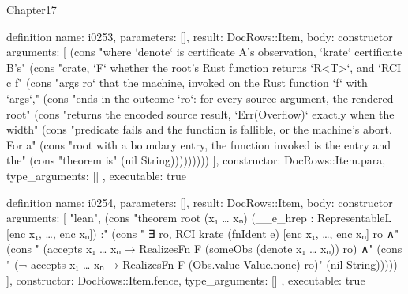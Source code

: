 \begin{lexlean}{Chapter17}
\begin{semanticmodule}
definition{
  name: i0253,
  parameters: [],
  result: DocRows::Item,
  body: constructor{
    arguments: [
      (cons "where `denote` is certificate A's observation, `krate` certificate B's" (cons "crate, `F` whether the root's Rust function returns `R<T>`, and `RCI c f" (cons "args ro` that the machine, invoked on the Rust function `f` with `args`," (cons "ends in the outcome `ro`: for every source argument, the rendered root" (cons "returns the encoded source result, `Err(Overflow)` exactly when the width" (cons "predicate fails and the function is fallible, or the machine's abort. For a" (cons "root with a boundary entry, the function invoked is the entry and the" (cons "theorem is" (nil String)))))))))
    ],
    constructor: DocRows::Item.para,
    type_arguments: []
  },
  executable: true
}

definition{
  name: i0254,
  parameters: [],
  result: DocRows::Item,
  body: constructor{
    arguments: [
      "lean",
      (cons "theorem root (x₁ … xₙ) (__e_hrep : RepresentableL [enc x₁, …, enc xₙ]) :" (cons "    ∃ ro, RCI krate (fnIdent e) [enc x₁, …, enc xₙ] ro ∧" (cons "      (accepts x₁ … xₙ → RealizesFn F (someObs (denote x₁ … xₙ)) ro) ∧" (cons "      (¬ accepts x₁ … xₙ → RealizesFn F (Obs.value Value.none) ro)" (nil String)))))
    ],
    constructor: DocRows::Item.fence,
    type_arguments: []
  },
  executable: true
}


\end{semanticmodule}
\end{lexlean}

